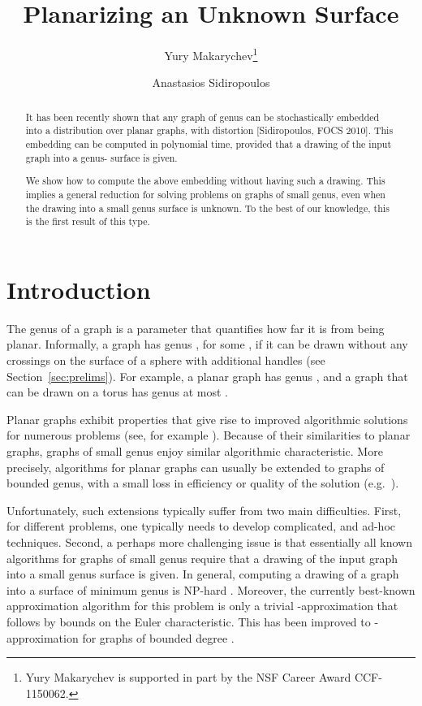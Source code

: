 \documentclass[envcountsect]{llncs}
\title{Planarizing an Unknown Surface}
\author{Yury Makarychev\thanks{Yury Makarychev is supported in part by the NSF Career Award CCF-1150062.}
\and Anastasios Sidiropoulos}
\institute{Toyota Technological Institute at Chicago\\
\url{yury@ttic.edu, tasos@ttic.edu}}
\begin{document}
\maketitle

\begin{abstract}
It has been recently shown that any graph of genus  can be stochastically embedded into a distribution over planar graphs, with distortion  [Sidiropoulos, FOCS 2010]. This embedding can be computed in polynomial time, provided that a drawing of the input graph into a genus- surface is given.

We show how to compute the above embedding without having such a drawing.
This implies a general reduction for solving problems on graphs of small genus, even when the drawing into a small genus surface is unknown.
To the best of our knowledge, this is the first result of this type.
\end{abstract}



\section{Introduction}

The genus of a graph is a parameter that quantifies how far it is from being planar.
Informally, a graph has genus , for some
, if it can be drawn without any crossings on the surface of
a sphere with  additional handles (see Section~\ref{sec:prelims}).  For example, a planar graph has genus , and a
graph that can be drawn on a torus has genus at most .

Planar graphs exhibit properties that give rise to improved algorithmic solutions for numerous problems (see, for example \cite{Baker-planar}).
Because of their similarities to planar graphs, graphs
of small genus enjoy similar algorithmic characteristic.
More precisely, algorithms for planar graphs can usually be extended to graphs of bounded genus, with a small loss in efficiency or quality of the solution (e.g.~\cite{CEN09}).

Unfortunately, such extensions typically suffer from two main difficulties.
First, for different problems, one typically needs to develop complicated, and ad-hoc techniques.
Second, a perhaps more challenging issue is that essentially all known algorithms for graphs of small genus require that a drawing of the input graph into a small genus surface is given.
In general, computing a drawing of a graph into a surface of minimum genus is NP-hard \cite{Thomassen89,Thomassen93a}.
Moreover, the currently best-known approximation algorithm for this problem is only a trivial -approximation that follows by bounds on the Euler characteristic.
This has been improved to -approximation for graphs of bounded degree \cite{ChenKK97}.
\end{document}
